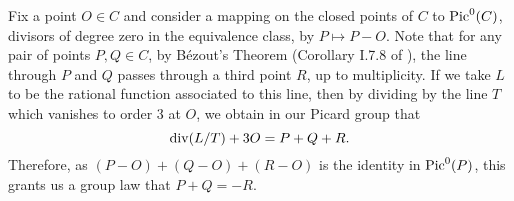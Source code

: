 Fix a point $O \in C$ and consider a mapping on the closed points of $C$ to ${\rm Pic}^0(C)$,
divisors of degree zero in the equivalence class,
by $P \mapsto P - O$.
Note that for any pair of points $P, Q \in C$,
by Bézout's Theorem (Corollary I.7.8 of \cite{Hartshorne_2013}), the line through $P$ and $Q$ passes through a third point $R$,
up to multiplicity.
If we take $L$ to be the rational function associated to this line,
then by dividing by the line $T$ which vanishes to order 3 at $O$,
we obtain in our Picard group that
\[
    {\rm div}(L/T) + 3O = P + Q + R.
\]
Therefore, as $(P - O) + (Q - O) + (R - O)$ is the identity in ${\rm Pic}^0(P)$,
this grants us a group law that $P + Q = -R$.